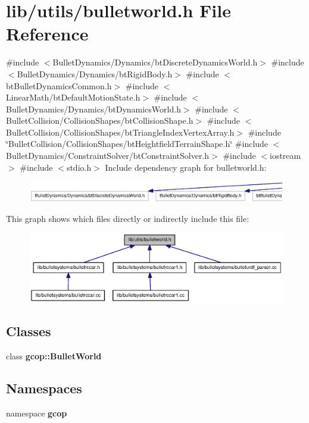 \section{lib/utils/bulletworld.h \-File \-Reference}
\label{bulletworld_8h}
{\ttfamily \#include $<$\-Bullet\-Dynamics/\-Dynamics/bt\-Discrete\-Dynamics\-World.\-h$>$}\*
{\ttfamily \#include $<$\-Bullet\-Dynamics/\-Dynamics/bt\-Rigid\-Body.\-h$>$}\*
{\ttfamily \#include $<$bt\-Bullet\-Dynamics\-Common.\-h$>$}\*
{\ttfamily \#include $<$\-Linear\-Math/bt\-Default\-Motion\-State.\-h$>$}\*
{\ttfamily \#include $<$\-Bullet\-Dynamics/\-Dynamics/bt\-Dynamics\-World.\-h$>$}\*
{\ttfamily \#include $<$\-Bullet\-Collision/\-Collision\-Shapes/bt\-Collision\-Shape.\-h$>$}\*
{\ttfamily \#include $<$\-Bullet\-Collision/\-Collision\-Shapes/bt\-Triangle\-Index\-Vertex\-Array.\-h$>$}\*
{\ttfamily \#include \char`\"{}\-Bullet\-Collision/\-Collision\-Shapes/bt\-Heightfield\-Terrain\-Shape.\-h\char`\"{}}\*
{\ttfamily \#include $<$\-Bullet\-Dynamics/\-Constraint\-Solver/bt\-Constraint\-Solver.\-h$>$}\*
{\ttfamily \#include $<$iostream$>$}\*
{\ttfamily \#include $<$stdio.\-h$>$}\*
\-Include dependency graph for bulletworld.\-h\-:
\nopagebreak
\begin{figure}[H]
\begin{center}
\leavevmode
\includegraphics[width=350pt]{bulletworld_8h__incl}
\end{center}
\end{figure}
\-This graph shows which files directly or indirectly include this file\-:
\nopagebreak
\begin{figure}[H]
\begin{center}
\leavevmode
\includegraphics[width=350pt]{bulletworld_8h__dep__incl}
\end{center}
\end{figure}
\subsection*{\-Classes}
\begin{DoxyCompactItemize}
\item 
class {\bf gcop\-::\-Bullet\-World}
\end{DoxyCompactItemize}
\subsection*{\-Namespaces}
\begin{DoxyCompactItemize}
\item 
namespace {\bf gcop}
\end{DoxyCompactItemize}
